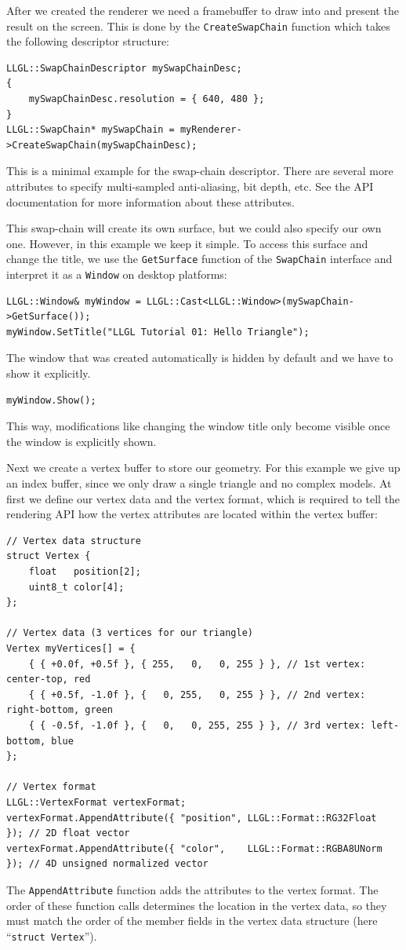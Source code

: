 \documentclass{article}
\begin{document}
After we created the renderer we need a framebuffer to draw into and present the result on the screen.
This is done by the \texttt{CreateSwapChain} function which takes the following descriptor structure:
\begin{lstlisting}
LLGL::SwapChainDescriptor mySwapChainDesc;
{
    mySwapChainDesc.resolution = { 640, 480 };
}
LLGL::SwapChain* mySwapChain = myRenderer->CreateSwapChain(mySwapChainDesc);
\end{lstlisting}
This is a minimal example for the swap-chain descriptor. There are several more attributes
to specify multi-sampled anti-aliasing, bit depth, etc.
See the API documentation for more information about these attributes.

This swap-chain will create its own surface, but we could also specify our own one.
However, in this example we keep it simple. To access this surface and change the title,
we use the \texttt{GetSurface} function of the \texttt{SwapChain} interface
and interpret it as a \texttt{Window} on desktop platforms:
\begin{lstlisting}
LLGL::Window& myWindow = LLGL::Cast<LLGL::Window>(mySwapChain->GetSurface());
myWindow.SetTitle("LLGL Tutorial 01: Hello Triangle");
\end{lstlisting}
The window that was created automatically is hidden by default and we have to show it explicitly.
\begin{lstlisting}
myWindow.Show();
\end{lstlisting}
This way, modifications like changing the window title only become visible once the window is explicitly shown.

Next we create a vertex buffer to store our geometry. For this example we give up an index buffer,
since we only draw a single triangle and no complex models. At first we define our vertex data and the vertex format,
which is required to tell the rendering API how the vertex attributes are located within the vertex buffer:
\begin{lstlisting}
// Vertex data structure
struct Vertex {
    float   position[2];
    uint8_t color[4];
};

// Vertex data (3 vertices for our triangle)
Vertex myVertices[] = {
    { { +0.0f, +0.5f }, { 255,   0,   0, 255 } }, // 1st vertex: center-top, red
    { { +0.5f, -1.0f }, {   0, 255,   0, 255 } }, // 2nd vertex: right-bottom, green
    { { -0.5f, -1.0f }, {   0,   0, 255, 255 } }, // 3rd vertex: left-bottom, blue
};

// Vertex format
LLGL::VertexFormat vertexFormat;
vertexFormat.AppendAttribute({ "position", LLGL::Format::RG32Float  }); // 2D float vector
vertexFormat.AppendAttribute({ "color",    LLGL::Format::RGBA8UNorm }); // 4D unsigned normalized vector
\end{lstlisting}
The \texttt{AppendAttribute} function adds the attributes to the vertex format.
The order of these function calls determines the location in the vertex data, so they must match
the order of the member fields in the vertex data structure (here ``\texttt{struct Vertex}'').
\end{document}
